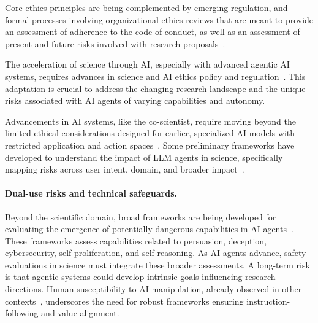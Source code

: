 Core ethics principles are being complemented by emerging regulation, and formal processes involving organizational ethics reviews that are meant to provide an assessment of adherence to the code of conduct, as well as an assessment of present and future risks involved with research proposals~\citep{shaw2006research, rothstein2006risks, ludlow2015regulating, verschraegen2018regulating}.

The acceleration of science through AI, especially with advanced agentic AI systems, requires advances in science and AI ethics policy and regulation~\citep{jobin2019global, wansley2016regulation}. This adaptation is crucial to address the changing research landscape and the unique risks associated with AI agents of varying capabilities and autonomy.

Advancements in AI systems, like the co-scientist, require moving beyond the limited ethical considerations designed for earlier, specialized AI models with restricted application and action spaces~\citep{gabriel2024ethics}. Some preliminary frameworks have developed to understand the impact of LLM agents in science, specifically mapping risks across user intent, domain, and broader impact~\citep{tang2024prioritizingsafeguardingautonomyrisks}.

\paragraph{Dual-use risks and technical safeguards.}
Beyond the scientific domain, broad frameworks are being developed for evaluating the emergence of potentially dangerous capabilities in AI agents~\citep{shevlane2023model, bova2024quantifying, phuong2024evaluating}. These frameworks assess capabilities related to persuasion, deception, cybersecurity, self-proliferation, and self-reasoning. As AI agents advance, safety evaluations in science must integrate these broader assessments. A long-term risk is that agentic systems could develop intrinsic goals influencing research directions. Human susceptibility to AI manipulation, already observed in other contexts~\citep{sabour2025humandecisionmakingsusceptibleaidriven}, underscores the need for robust frameworks ensuring instruction-following and value alignment.

